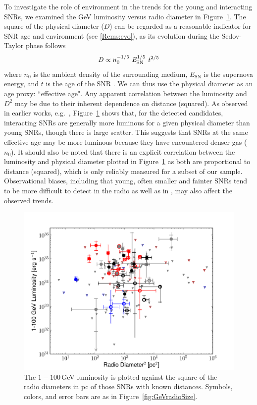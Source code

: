 To investigate the role of environment in the trends for the young and interacting SNRs, we examined the GeV luminosity versus radio diameter in Figure~\ref{fig:LumDia}. The square of the physical diameter ($D$) can be regarded as a reasonable indicator for SNR age and environment (see \ref{Rems:evo}), as its evolution during the Sedov-Taylor phase follows
\begin{equation}
\label{eq:Sedov}
{\it D} \propto n_0^{-1/5} \ {\it E}_{\mathrm{SN}}^{1/5} \ {\it t}^{2/5}
\end{equation}
where $n_0$ is the ambient density of the surrounding medium, $E_{\mathrm{SN}}$ is the supernova energy, and $t$ is the age of the SNR \citep{1950RSPSA.201..159T,1959sdmm.book.....S}. We can thus use the physical diameter as an age proxy: ``effective age". Any apparent correlation between the luminosity and $D^2$ may be due to their inherent dependence on distance (squared). As observed in earlier works, e.g.~\cite{Thompson12-FermiCRsReview}, Figure~\ref{fig:LumDia} shows that, for the detected candidates, interacting SNRs are generally more luminous for a given physical diameter than young SNRs, though there is large scatter. This suggests that SNRs at the same effective age may be more luminous because they have encountered denser gas ($n_0$). It should also be noted that there is an explicit correlation between the luminosity and physical diameter plotted in Figure~\ref{fig:LumDia} as both are proportional to distance (squared), which is only reliably measured for a subset of our sample. Observational biases, including that young, often smaller and fainter SNRs tend to be more difficult to detect in the radio as well as in \gam{}, may also affect the observed trends.


\begin{figure}[h]
	\centering
	\includegraphics[width=1.0\columnwidth]{figures/lum_vs_dia2.pdf}
	\caption[$1-100$\,GeV luminosity vs. D$^2$ for SNRs with distance measurement.]{
		The $1-100$\,GeV luminosity is plotted against the square of the radio diameters in pc of those SNRs with known distances. Symbols, colors, and error bars are as in Figure~\ref{fig:GeVradioSize}.}
		\label{fig:LumDia}
\end{figure}

